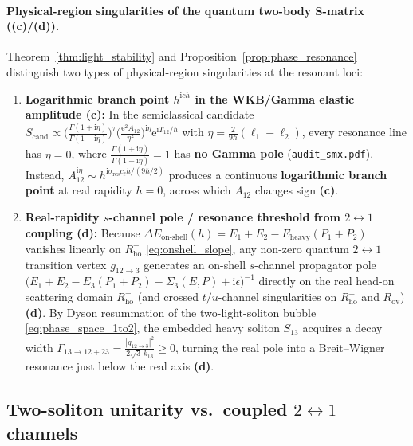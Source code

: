 \documentclass[11pt,a4paper]{article}
\newcommand{\Lc}{\textsf{\textbf{(c)}}\xspace}
\newcommand{\Ld}{\textsf{\textbf{(d)}}\xspace}
\newcommand{\ii}{\mathrm{i}}
\newcommand{\ee}{\mathrm{e}}
\newcommand{\hb}{\hbar}
\theoremstyle{remark}
\begin{document}
\paragraph{Physical-region singularities of the quantum two-body S-matrix (\Lc/\Ld).}
Theorem~\ref{thm:light_stability} and Proposition~\ref{prop:phase_resonance}
distinguish two types of physical-region singularities at the resonant loci:
\begin{enumerate}
\item \textbf{Logarithmic branch point $h^{\ii c h}$ in the WKB/Gamma elastic amplitude \Lc:}
In the semiclassical candidate $S_{\mathrm{cand}} \propto \big(\frac{\Gamma(1+\ii\eta)}{\Gamma(1-\ii\eta)}\big)^\tau\big(\frac{\ee^2 A_{12}}{\eta^2}\big)^{\ii\eta}\ee^{\ii T_{12}/\hb}$
with $\eta = \frac{2}{9\hb}(\ell_1-\ell_2)$, every resonance line has $\eta = 0$,
where $\frac{\Gamma(1+\ii\eta)}{\Gamma(1-\ii\eta)} = 1$ has \textbf{no Gamma pole}
(\texttt{audit\_smx.pdf}). Instead, $A_{12}^{\ii\eta} \sim h^{\ii\sigma_{\mathrm{res}}c_\ell h/(9\hb/2)}$
produces a continuous \textbf{logarithmic branch point} at real rapidity $h=0$,
across which $A_{12}$ changes sign \Lc.
\item \textbf{Real-rapidity $s$-channel pole / resonance threshold from $2\leftrightarrow 1$ coupling \Ld:}
Because $\Delta E_{\mathrm{on\text{-}shell}}(h) = E_1+E_2-E_{\mathrm{heavy}}(P_1+P_2)$
vanishes linearly on $R_{\mathrm{ho}}^+$ \eqref{eq:onshell_slope}, any non-zero
quantum $2\leftrightarrow 1$ transition vertex $g_{12\to 3}$ generates an
on-shell $s$-channel propagator pole $\big(E_1+E_2-E_3(P_1+P_2) - \Sigma_3(E,P) + \ii\epsilon\big)^{-1}$
directly on the real head-on scattering domain $R_{\mathrm{ho}}^+$ (and crossed
$t/u$-channel singularities on $R_{\mathrm{ho}}^-$ and $R_{\mathrm{ov}}$) \Ld.
By Dyson resummation of the two-light-soliton bubble \eqref{eq:phase_space_1to2},
the embedded heavy soliton $S_{13}$ acquires a decay width
$\Gamma_{13\to 12+23} = \frac{|g_{12\to 3}|^2}{2\sqrt{3}\,k_{13}} \ge 0$, turning
the real pole into a Breit--Wigner resonance just below the real axis \Ld.
\end{enumerate}

\subsection{Two-soliton unitarity vs.\ coupled \texorpdfstring{$2\leftrightarrow 1$}{2<->1} channels}
\end{document}
